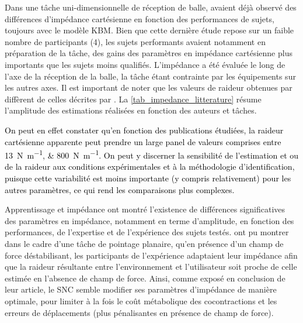 Dans une tâche uni-dimensionnelle de réception de balle, \textcite{tsuji_bio-mimetic_2008} avaient déjà observé des différences d'impédance cartésienne en fonction des performances de sujets, toujours avec le modèle KBM. Bien que cette dernière étude repose sur un faible nombre de participants (4), les sujets performants avaient notamment en préparation de la tâche, des gains des paramètres en impédance cartésienne plus importants que les sujets moins qualifiés. L'impédance a été évaluée le long de l'axe de la réception de la balle, la tâche étant contrainte par les équipements sur les autres axes. Il est important de noter que les valeurs de raideur obtenues par \textcite{tsuji_bio-mimetic_2008} diffèrent de celles décrites par \textcite{erden_hand_2015}. La \cref{tab_impedance_litterature} résume l'amplitude des estimations réalisées en fonction des auteurs et tâches. 

\textcolor{black}{On peut en effet constater qu'en fonction des publications étudiées, la raideur cartésienne apparente peut prendre un large panel de valeurs comprises entre \SIlist{13;800}{\newton\per\meter}. On peut y discerner la sensibilité de l'estimation et ou de la raideur aux conditions expérimentales et à la méthodologie d'identification, puisque cette variabilité est moins importante (y compris relativement) pour les autres paramètres, ce qui rend les comparaisons plus complexes.}

\begin{aside}{Apprentissage et impédance}
	\parencite{tsuji_bio-mimetic_2008, erden_hand_2015} ont montré l'existence de différences significatives des paramètres en impédance, notamment en terme d'amplitude, en fonction des performances, de l'expertise et de l'expérience des sujets testés. \parencite{burdet_central_2001} ont pu montrer dans le cadre d'une tâche de pointage planaire, qu'en présence d'un champ de force déstabilisant, les participants de l'expérience adaptaient leur impédance afin que la raideur résultante entre l'environnement et l'utilisateur soit proche de celle estimée en l'absence de champ de force. Ainsi, comme exposé en conclusion de leur article, le SNC semble modifier ses paramètres d'impédance de manière optimale, pour limiter à la fois le coût métabolique des cocontractions et les erreurs de déplacements (plus pénalisantes en présence de champ de force).	
\end{aside}

